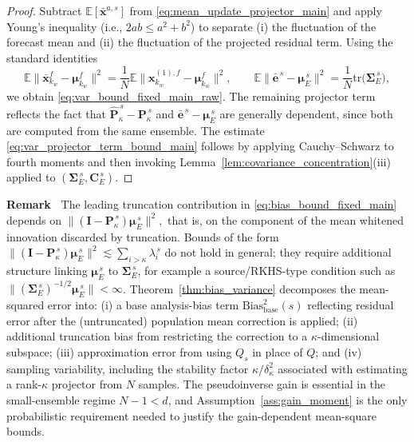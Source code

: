 \documentclass[11pt,a4paper]{article}
\begin{document}
\begin{proof}
\smallskip
\noindent Subtract $\mathbb{E}[\bar{\mathbf{x}}^{a,s}]$ from \eqref{eq:mean_update_projector_main} and apply Young's inequality (i.e., $2ab\le a^2+b^2$) to separate (i) the fluctuation of the forecast mean and (ii) the fluctuation of the projected residual term. Using the standard identities
\begin{equation}
\mathbb{E}\|\bar{\mathbf{x}}_{k_w}^f-\boldsymbol{\mu}_{k_w}^f\|^2=\frac{1}{N}\mathbb{E}\|\mathbf{x}_{k_w}^{(1),f}-\boldsymbol{\mu}_{k_w}^f\|^2,
\qquad
\mathbb{E}\|\bar{\mathbf{e}}^{\,s}-\boldsymbol{\mu}_E^{\,s}\|^2=\frac{1}{N}\mathrm{tr}\!\bigl(\boldsymbol{\Sigma}_E^{\,s}\bigr),
\end{equation}
we obtain \eqref{eq:var_bound_fixed_main_raw}. The remaining projector term reflects the fact that $\hat{\mathbf{P}}_\kappa^{\,s}-\mathbf{P}_\kappa^{\,s}$ and $\bar{\mathbf{e}}^{\,s}-\boldsymbol{\mu}_E^{\,s}$ are generally dependent, since both are computed from the same ensemble. The estimate \eqref{eq:var_projector_term_bound_main} follows by applying Cauchy--Schwarz to fourth moments and then invoking Lemma~\ref{lem:covariance_concentration}(iii) applied to $(\boldsymbol{\Sigma}_E^{\,s},\mathbf{C}_E^{\,s})$.
\end{proof}

\par\smallskip\noindent{}\textbf{Remark~\theremark}
\label{rem:truncation_bias_tail}
The leading truncation contribution in \eqref{eq:bias_bound_fixed_main} depends on
\(
\|(\mathbf{I}-\mathbf{P}_\kappa^{\,s})\boldsymbol{\mu}_E^{\,s}\|^2,
\)
that is, on the component of the mean whitened innovation discarded by truncation. Bounds of the form
\(
\|(\mathbf{I}-\mathbf{P}_\kappa^{\,s})\boldsymbol{\mu}_E^{\,s}\|^2\lesssim \sum_{i>\kappa}\lambda_i^{\,s}
\)
do not hold in general; they require additional structure linking $\boldsymbol{\mu}_E^{\,s}$ to $\boldsymbol{\Sigma}_E^{\,s}$, for example a source/RKHS-type condition such as $\|(\boldsymbol{\Sigma}_E^{\,s})^{-1/2}\boldsymbol{\mu}_E^{\,s}\|<\infty$.
Theorem~\ref{thm:bias_variance} decomposes the mean-squared error into: (i) a base analysis-bias term $\mathrm{Bias}_{\mathrm{base}}^{2}(s)$ reflecting residual error after the (untruncated) population mean correction is applied; (ii) additional truncation bias from restricting the correction to a $\kappa$-dimensional subspace; (iii) approximation error from using $Q_s$ in place of $Q$; and (iv) sampling variability, including the stability factor $\kappa/\delta_\kappa^2$ associated with estimating a rank-$\kappa$ projector from $N$ samples. The pseudoinverse gain is essential in the small-ensemble regime $N-1<d$, and Assumption~\ref{ass:gain_moment} is the only probabilistic requirement needed to justify the gain-dependent mean-square bounds.
\end{document}
